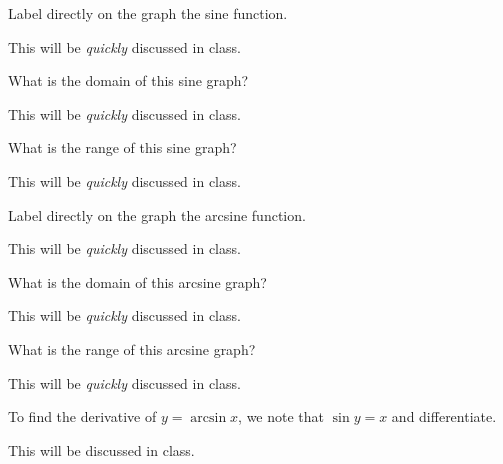 \documentclass[12pt,addpoints, answers, fleqn]{exam}
\begin{document}
\begin{questions}
\question Label directly on the graph the sine function.

\begin{solution}
This will be \emph{quickly} discussed in class.
\end{solution}

\question What is the domain of this sine graph?

\begin{solution}
This will be \emph{quickly} discussed in class.
\end{solution}

\question What is the range of this sine graph?

\begin{solution}
This will be \emph{quickly} discussed in class.
\end{solution}

\question Label directly on the graph the arcsine function.

\begin{solution}
This will be \emph{quickly} discussed in class.
\end{solution}

\question What is the domain of this arcsine graph?

\begin{solution}
This will be \emph{quickly} discussed in class.
\end{solution}

\question What is the range of this arcsine graph?

\begin{solution}
This will be \emph{quickly} discussed in class.
\end{solution}

\question To find the derivative of $y = \arcsin x$, we note that $\sin y = x$ and differentiate.
\begin{solution}
This will be discussed in class.
\end{solution}



\end{questions}
\end{document}

